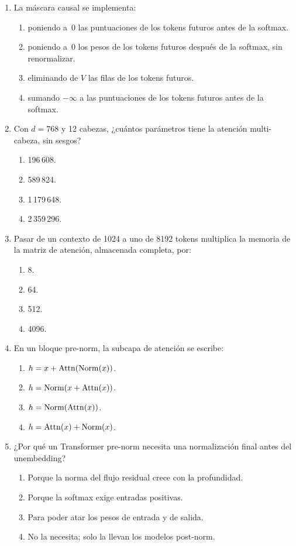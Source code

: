 \begin{enumerate}[label=\textbf{A.\arabic*.},ref=A.\arabic*,leftmargin=2.6em,itemsep=8pt]
\item\label{q:mascara} La máscara causal se implementa: \punto
\begin{enumerate}[label=(\alph*)]
  \item poniendo a~0 las puntuaciones de los tokens futuros antes de la softmax.
  \item poniendo a~0 los pesos de los tokens futuros después de la softmax, sin renormalizar.
  \item eliminando de $V$ las filas de los tokens futuros.
  \item sumando $-\infty$ a las puntuaciones de los tokens futuros antes de la softmax.
\end{enumerate}

\item\label{q:mha} Con $d=768$ y 12 cabezas, ¿cuántos parámetros tiene la atención multi-cabeza, sin sesgos? \punto
\begin{enumerate}[label=(\alph*)]
  \item 196\,608.
  \item 589\,824.
  \item 1\,179\,648.
  \item 2\,359\,296.
\end{enumerate}

\item\label{q:contexto} Pasar de un contexto de 1024 a uno de 8192 tokens multiplica la memoria de la matriz de atención, almacenada completa, por: \punto
\begin{enumerate}[label=(\alph*)]
  \item 8.
  \item 64.
  \item 512.
  \item 4096.
\end{enumerate}

\item\label{q:prenorm} En un bloque pre-norm, la subcapa de atención se escribe: \punto
\begin{enumerate}[label=(\alph*)]
  \item $h=x+\operatorname{Attn}(\operatorname{Norm}(x))$.
  \item $h=\operatorname{Norm}(x+\operatorname{Attn}(x))$.
  \item $h=\operatorname{Norm}(\operatorname{Attn}(x))$.
  \item $h=\operatorname{Attn}(x)+\operatorname{Norm}(x)$.
\end{enumerate}

\item\label{q:normfinal} ¿Por qué un Transformer pre-norm necesita una normalización final antes del unembedding? \punto
\begin{enumerate}[label=(\alph*)]
  \item Porque la norma del flujo residual crece con la profundidad.
  \item Porque la softmax exige entradas positivas.
  \item Para poder atar los pesos de entrada y de salida.
  \item No la necesita; solo la llevan los modelos post-norm.
\end{enumerate}


\end{enumerate}
